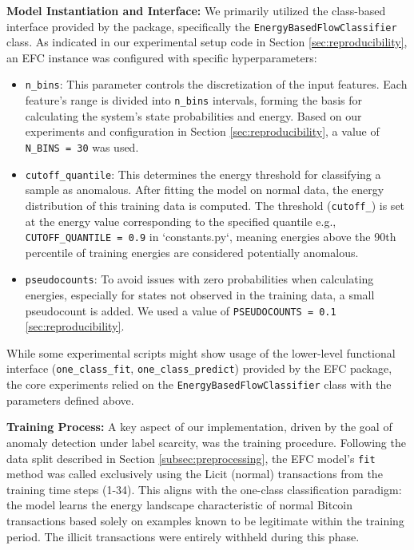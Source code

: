 \documentclass[12pt]{article}
\begin{document}
\textbf{Model Instantiation and Interface:} We primarily utilized the class-based interface provided by the package,
specifically the \texttt{EnergyBasedFlowClassifier} class. As indicated in our experimental setup code in Section \ref{sec:reproducibility},
an EFC instance was configured with specific hyperparameters:

\begin{itemize}
    \item \texttt{n\_bins}: This parameter controls the discretization of the input features. Each feature's range is
      divided into \texttt{n\_bins} intervals, forming the basis for calculating the system's state probabilities and
      energy. Based on our experiments and configuration in Section \ref{sec:reproducibility}, a value of \texttt{N\_BINS = 30} was used.
    \item \texttt{cutoff\_quantile}: This determines the energy threshold for classifying a sample as anomalous. After
      fitting the model on normal data, the energy distribution of this training data is computed. The threshold
      (\texttt{cutoff\_}) is set at the energy value corresponding to the specified quantile
      e.g., \texttt{CUTOFF\_QUANTILE = 0.9} in `constants.py`, meaning energies above the 90th percentile of training
      energies are considered potentially anomalous.
    \item \texttt{pseudocounts}: To avoid issues with zero probabilities when calculating energies, especially for states 
      not observed in the training data, a small pseudocount is added. We used a value of \texttt{PSEUDOCOUNTS = 0.1}
      \ref{sec:reproducibility}.
\end{itemize}

While some experimental scripts might show usage of the lower-level functional interface
(\texttt{one\_class\_fit}, \texttt{one\_class\_predict}) provided by the EFC package, the core experiments relied on the
\texttt{EnergyBasedFlowClassifier} class with the parameters defined above.

\textbf{Training Process:} A key aspect of our implementation, driven by the goal of anomaly detection under label scarcity,
was the training procedure. Following the data split described in Section \ref{subsec:preprocessing}, the EFC model's
\texttt{fit} method was called exclusively using the Licit (normal) transactions from the training time steps (1-34).
This aligns with the one-class classification paradigm: the model learns the energy landscape characteristic of normal
Bitcoin transactions based solely on examples known to be legitimate within the training period. The illicit transactions
were entirely withheld during this phase.
\end{document}
